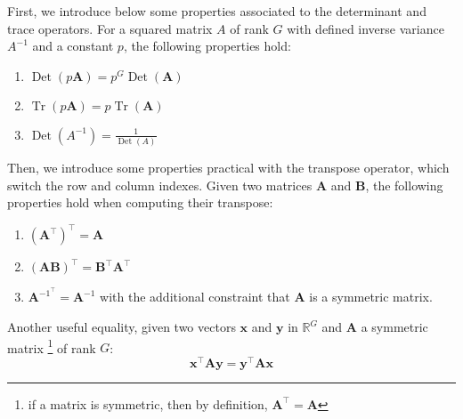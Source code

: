 \documentclass[long, final]{jobim}
\DeclareMathOperator*{\Tr}{Tr}
\DeclareMathOperator*{\DET}{Det}
\newcommand \RR {\mathbb{R}}
\begin{document}
\begin{property}
\label{pr:linear-algebra}
First, we introduce below some properties associated to the determinant and trace operators. For a squared matrix $A$ of rank $G$ with defined inverse variance $A^{-1}$ and a constant $p$, the following properties hold:
\begin{multicols}{3}
\begin{enumerate}[label=\emph{\alph*})]
\item $\DET(p\boldsymbol{A})=p^G \DET (\boldsymbol{A})$
\item $\Tr\left(p \boldsymbol{A}\right)=p \Tr(\boldsymbol{A})$
\item $\DET(A^{-1})=\frac{1}{\DET(A)}$
\end{enumerate}
\end{multicols}

Then, we introduce some properties practical with the transpose operator, which switch the row and column indexes. Given two matrices $\boldsymbol{A}$ and $\boldsymbol{B}$, the following properties hold when computing their transpose:
\begin{multicols}{3}
\begin{enumerate}
    \item $(\boldsymbol{A}^\top)^\top=\boldsymbol{A}$
    \item $(\boldsymbol{A}\boldsymbol{B})^\top=\boldsymbol{B}^\top\boldsymbol{A}^\top$
    \item $\boldsymbol{A}^{{-1}^\top}=\boldsymbol{A}^{-1}$ with the additional constraint that $\boldsymbol{A}$ is a symmetric matrix.
\end{enumerate}
\end{multicols}


Another useful equality, given two vectors $\boldsymbol{x}$ and $\boldsymbol{y}$ in $\RR^G$ and $\boldsymbol{A}$ a symmetric matrix \footnote{if a matrix is symmetric, then by definition, $\boldsymbol{A}^\top=\boldsymbol{A}$} of rank $G$:
\begin{equation*}
    \boldsymbol{x}^\top \boldsymbol{A} \boldsymbol{y} = \boldsymbol{y}^\top \boldsymbol{A} \boldsymbol{x}
\end{equation*}
\end{property}
\end{document}
